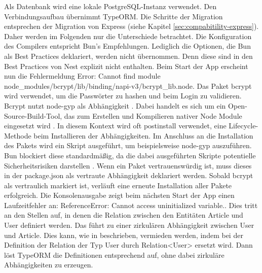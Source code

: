 \noindent
Als Datenbank wird eine lokale PostgreSQL-Instanz verwendet. Den Verbindungsaufbau übernimmt TypeORM. Die Schritte der Migration entsprechen der Migration von Express (siehe Kapitel \ref{sec:compabitility-express}). Daher werden im Folgenden nur die Unterschiede betrachtet. Die Konfiguration des Compilers entspricht Bun's Empfehlungen. Lediglich die Optionen, die Bun als Best Practices deklariert, werden nicht übernommen. Denn diese sind in den Best Practices von Nest explizit nicht enthalten. \newline
Beim Start der App erscheint nun die Fehlermeldung \glq Error: Cannot find module node\_modules/bcrypt/lib/binding/napi-v3/bcrypt\_lib.node\grq{}. Das Paket \glq bcrypt\grq{} wird verwendet, um die Passwörter zu hashen und beim Login zu validieren. \glq Bcrypt\grq{} nutzt \glq node-gyp\grq{} als Abhängigkeit \cite{DelGobbo.2018}. Dabei handelt es sich um ein Open-Source-Build-Tool, das zum Erstellen und Kompilieren nativer Node Module eingesetzt wird \cite{OpenJSFoundation.o.J.c}. In diesem Kontext wird oft \glq postinstall\grq{} verwendet, eine Lifecycle-Methode beim Installieren der Abhängigkeiten. Im Anschluss an die Installation des Pakets wird ein Skript ausgeführt, um beispielsweise \glq node-gyp\grq{} auszuführen. Bun blockiert diese standardmäßig, da die dabei ausgeführten Skripte potentielle Sicherheitsrisiken darstellen \cite{OvenSh.2023}. Wenn ein Paket vertrauenswürdig ist, muss dieses in der \glq package.json\grq{} als vertraute Abhängigkeit deklariert werden. Sobald \glq bcrypt\grq{} als vertraulich markiert ist, verläuft eine erneute Installation aller Pakete erfolgreich.\newline
Die Konsolenausgabe zeigt beim nächsten Start der App einen Laufzeitfehler an: \glq ReferenceError: Cannot access uninitialized variable.\grq{}. Dies tritt an den Stellen auf, in denen die Relation zwischen den Entitäten \glq Article\grq{} und \glq User\grq{} definiert werden. Das führt zu einer zirkulären Abhängigkeit zwischen \glq User\grq{} und \glq Article\grq{}. Dies kann, wie in \cite{TypeORM.} beschrieben, vermieden werden, indem bei der Definition der Relation der Typ \glq User\grq{} durch \glq Relation<User>\grq{} ersetzt wird. Dann löst TypeORM die Definitionen entsprechend auf, ohne dabei zirkuläre Abhängigkeiten zu erzeugen.\\

